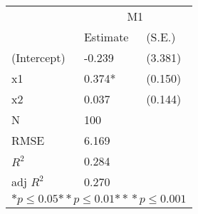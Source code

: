\begin{tabular}{*{3}{l}}
\hline
                  & \multicolumn{2}{c}{M1}   \tabularnewline
                   &Estimate  &(S.E.)  \tabularnewline
 \hline
 \hline
   (Intercept)     &-0.239   &   (3.381) \tabularnewline
   x1              &0.374*   &   (0.150) \tabularnewline
   x2              &0.037   &   (0.144) \tabularnewline
 \hline
 N                 &100       &        \tabularnewline
 RMSE             &6.169         & \tabularnewline
 $R^2$             &0.284         & \tabularnewline
 adj $R^2$         &0.270         & \tabularnewline
 \hline
\hline
 
 \multicolumn{3}{c}{${*  p}\le 0.05$${*\!\!*  p}\le 0.01$${*\!\!*\!\!*  p}\le 0.001$}\tabularnewline
 \end{tabular}